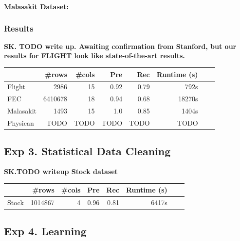 \vspace{0.5em}\noindent\textbf{Malasakit Dataset: }


 
\subsubsection{Results}

\textbf{SK. TODO write up. Awaiting confirmation from Stanford, but our results for FLIGHT look like state-of-the-art results.}

\begin{table}[ht]
\centering
\begin{tabular}{|l|r|r|r|r|r|r|r|}
\hline
 & \#rows & \#cols & Pre & Rec & Runtime (s) \\
\hline
Flight	&2986&15&0.92&	0.79&	792s\\
\hline
FEC	&6410678&18&0.94&	0.68&	18270s\\
\hline
Malasakit &1493& 15& 1.0 & 0.85& 1404s\\
\hline
Physican	&TODO&TODO&TODO&TODO&TODO\\
\hline
\end{tabular}
\end{table}




\subsection*{Exp 3. Statistical Data Cleaning}

\textbf{SK.TODO writeup Stock dataset}


\begin{table}[ht]
\centering
\begin{tabular}{|l|r|r|r|r|r|r|r|}
\hline
 & \#rows & \#cols & Pre & Rec & Runtime (s) \\
\hline
Stock	&1014867&4& 0.96&	0.81&	6417s\\
\hline
\end{tabular}
\end{table}



\subsection*{Exp 4. Learning}

